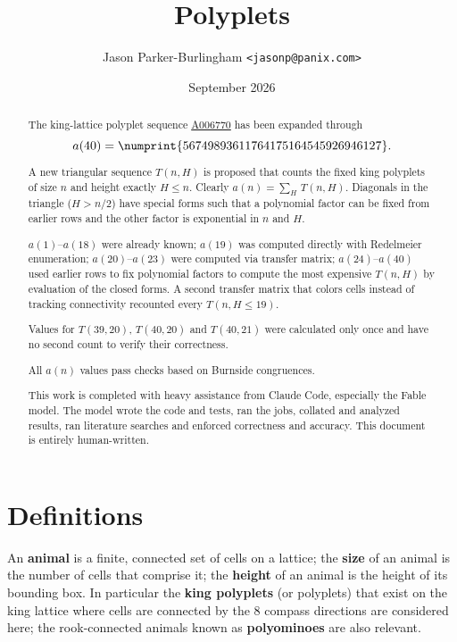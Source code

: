 \documentclass[11pt]{article}
\title{Polyplets}
\author{Jason Parker-Burlingham \texttt{<jasonp@panix.com>}}
\date{September 2026}
\newcommand{\num}[1]{\numprint{#1}}
\begin{document}
\maketitle

\begin{abstract} The king-lattice polyplet sequence \href{https://oeis.org/A006770}{A006770} has
been expanded through \[a(40) = \num{56749893611764175164545926946127}.\]

A new triangular sequence $T(n,H)$  is proposed that counts the fixed king polyplets of size $n$ and
height exactly $H\le{}n$. Clearly $a(n) = \sum_H\,T(n,H)$. Diagonals in the triangle ($H>n/2$) have
special forms such that a polynomial factor can be fixed from earlier rows and the other factor is
exponential in $n$ and $H$.

$a(1)$--$a(18)$ were already known; $a(19)$ was computed directly with Redelmeier enumeration;
$a(20)$--$a(23)$ were computed via transfer matrix; $a(24)$--$a(40)$ used earlier rows to fix
polynomial factors to compute the most expensive $T(n,H)$ by evaluation of the closed forms.  A
second transfer matrix that colors cells instead of tracking connectivity recounted every
$T(n,H\le19)$.

Values for $T(39,20)$, $T(40,20)$ and $T(40,21)$ were calculated only once and have no second count
to verify their correctness.

All $a(n)$ values pass checks based on Burnside congruences.

This work is completed with heavy assistance from Claude Code, especially the Fable model.  The
model wrote the code and tests, ran the jobs, collated and analyzed results, ran literature searches
and enforced correctness and accuracy.  This document is entirely human-written.
\end{abstract}

\section{Definitions}
\label{sec:definitions}

An \textbf{animal} is a finite, connected set of cells on a lattice; the \textbf{size} of an animal
is the number of cells that comprise it; the \textbf{height} of an animal is the height of its
bounding box.  In particular the \textbf{king polyplets} (or polyplets) that exist on the king
lattice where cells are connected by the 8 compass directions are considered here; the
rook-connected animals known as \textbf{polyominoes} are also relevant.
\end{document}
